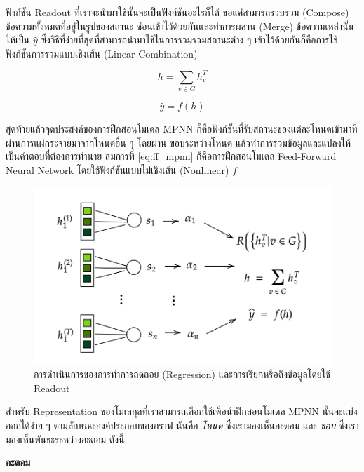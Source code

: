 \noindent ฟังก์ชัน Readout ที่เราจะนำมาใช้นั้นจะเป็นฟังก์ชันอะไรก็ได้ ขอแค่สามารถรวบรวม (Compose) ข้อความทั้งหมดที่อยู่ในรูปของสถานะ%
ซ่อนเข้าไว้ด้วยกันและทำการผสาน (Merge) ข้อความเหล่านั้นให้เป็น $\hat{y}$ ซึ่งวิธีที่ง่ายที่สุดที่สามารถนำมาใช้ในการรวมรวมสถานะต่าง ๆ 
เข้าไว้ด้วยกันก็คือการใช้ฟังก์ชันการรวมแบบเชิงเส้น (Linear Combination)

\begin{equation}
    h = \sum_{v \in G} h^{T}_{v}
\end{equation}

\begin{equation}\label{eq:ff_mpnn}
    \hat{y} = f(h)
\end{equation}

สุดท้ายแล้วจุดประสงค์ของการฝึกสอนโมเดล MPNN ก็คือฟังก์ชันที่รับสถานะของแต่ละโหนดเข้ามาที่ผ่านการแผ่กระจายมาจากโหนดอื่น ๆ โดยผ่าน%
ขอบระหว่างโหนด แล้วทำการรวมข้อมูลและแปลงให้เป็นคำตอบที่ต้องการทำนาย สมการที่ \ref{eq:ff_mpnn} ก็คือการฝึกสอนโมเดล 
Feed-Forward Neural Network โดยใช้ฟังก์ชันแบบไม่เชิงเส้น (Nonlinear) $f$

\begin{figure}[htbp]
    \centering
    \includegraphics[width=0.9\linewidth]{fig/mp-operation.png}
    \caption{การดำเนินการของการทำการถดถอย (Regression) และการเรียกหรือดึงข้อมูลโดยใช้ Readout}
    \label{fig:mp_operation}
\end{figure}

สำหรับ Representation ของโมเลกุลที่เราสามารถเลือกใช้เพื่อนำฝึกสอนโมเดล MPNN นั้นจะแบ่งออกได้ง่าย ๆ ตามลักษณะองค์ประกอบของกราฟ 
นั่นคือ \textit{โหนด} ซึ่งเรามองเห็นอะตอม และ \textit{ขอบ} ซึ่งเรามองเห็นพันธะระหว่างอะตอม ดังนี้

\noindent \textbf{อะตอม}

